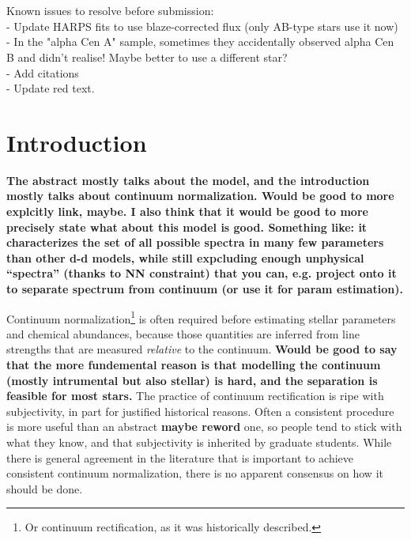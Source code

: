 \documentclass[modern]{aastex631}
\newcommand{\todo}[1]{\textcolor{tab:red}{#1}}
\newcommand{\ajw}[1]{\textbf{#1}}
\begin{document}

\keywords{\todo{Some --- keywords --- here}}

\section*{}\noindent\todo{
Known issues to resolve before submission:\\
- Update HARPS fits to use blaze-corrected flux (only AB-type stars use it now)\\
- In the "alpha Cen A" sample, sometimes they accidentally observed alpha Cen B and didn't realise! Maybe better to use a different star?\\
- Add citations\\
- Update red text.
}


\clearpage
\section{Introduction}\label{sec:intro}

\ajw{
The abstract mostly talks about the model, and the introduction mostly talks about continuum normalization.  Would be good to more explcitly link, maybe.
I also think that it would be good to more precisely state what about this model is good.
Something like: it characterizes the set of all possible spectra in many few parameters than other d-d models, while still expcluding enough unphysical ``spectra'' (thanks to NN constraint) that you can, e.g. project onto it to separate spectrum from continuum (or use it for param estimation).
}

Continuum normalization\footnote{Or continuum rectification, as it was historically described.} is often required before estimating stellar parameters and chemical abundances, because those quantities are inferred from line strengths that are measured \emph{relative} to the continuum.
\ajw{Would be good to say that the more fundemental reason is that modelling the continuum (mostly intrumental but also stellar) is hard, and the separation is feasible for most stars.}
The practice of continuum rectification is ripe with subjectivity, in part for justified historical reasons. Often a consistent procedure is more useful than an abstract \ajw{maybe reword} one, so people tend to stick with what they know, and that subjectivity is inherited by graduate students. While there is general agreement in the literature that is important to achieve consistent continuum normalization, there is no apparent consensus on how it should be done.\\
\end{document}
